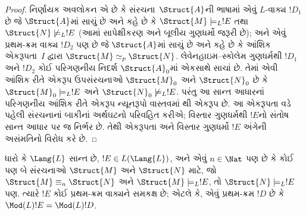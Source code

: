 \begin{proof}
નિર્ણાયક અવલોકન એ છે કે સંરચના~$\Struct{A}$ની ભાષામાં
એવું $L$-વાક્ય $!D_1$ છે જે $\Struct{A}$માં સાચું છે અને કહે છે
કે $\Struct{M} \models_L !E$ તથા $\Struct{N} \not\models_L !E$ (આમાં
સાપેક્ષીકરણ અને બૂલીય ગુણધર્મો જરૂરી છે); અને એવું પ્રથમ-ક્રમ
વાક્ય $!D_2$ પણ છે જે $\Struct{A}$માં સાચું છે અને કહે છે કે
આંશિક એકરૂપતા~$I$ દ્વારા $\Struct{M} \simeq_p \Struct{N}$.
લેવેનહાઇમ--સ્કોલેમ ગુણધર્મથી $!D_1$ અને $!D_2$ કોઈ
પરિગણનીય નિદર્શ $\Struct{A}_0$માં એકસાથે સાચાં છે. તેમાં એવી
આંશિક રીતે એકરૂપ ઉપસંરચનાઓ $\Struct{M}_0$ અને $\Struct{N}_0$ છે કે
$\Struct{M}_0 \models_L !E$ અને $\Struct{N}_0 \not\models_L !E$.
પરંતુ આ સાન્ત આધારનાં પરિગણનીય આંશિક રીતે એકરૂપ ન્યૂનરૂપો
વાસ્તવમાં થી એકરૂપ છે. આ એકરૂપતા વડે
પહેલી સંરચનાનાં બાકીનાં અર્થઘટનો પરિવહિત કરીએ; વિસ્તાર ગુણધર્મથી
$!E$નો સંતોષ સાન્ત આધાર પર જ નિર્ભર છે. તેથી એકરૂપતા અને વિસ્તાર
ગુણધર્મો $!E$ અંગેની અસંમતિનો વિરોધ કરે છે.
\end{proof}
\endgroup


\begingroup
\makeatletter{}\makeatother


\label{guunit:OLP-0207}


\begin{lem}
ધારો કે $\Lang{L}$ સાન્ત છે, $!E \in L(\Lang{L})$, અને એવું
$n \in \Nat$ પણ છે કે કોઈ પણ બે સંરચનાઓ $\Struct{M}$ અને
$\Struct{N}$ માટે, જો $\Struct{M} \equiv_n \Struct{N}$ અને
$\Struct{M} \models_L !E$, તો $\Struct{N} \models_L !E$ પણ. ત્યારે
$!E$ કોઈ પ્રથમ-ક્રમ વાક્યને સમકક્ષ છે; એટલે કે, એવું પ્રથમ-ક્રમ
$!D$ છે કે $\Mod(L){!E} = \Mod(L){!D}$.
\end{lem}

